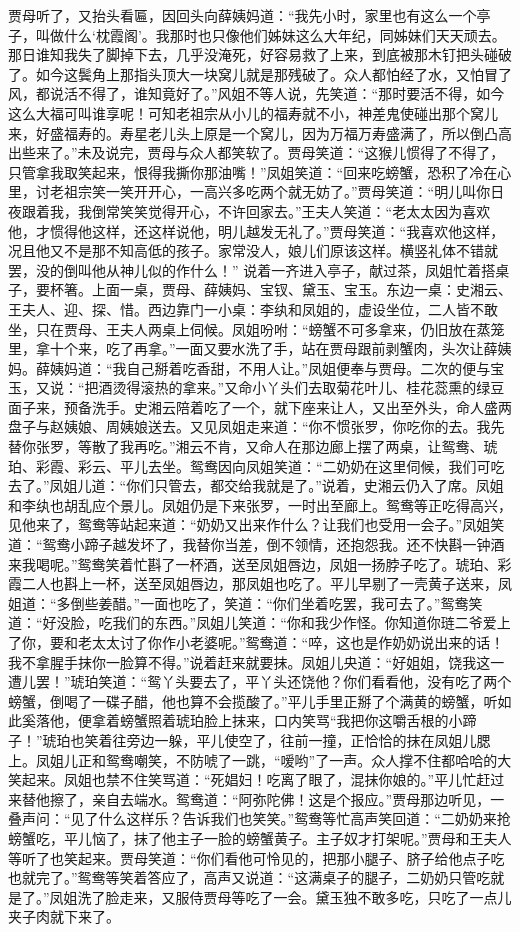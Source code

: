 \documentclass[12pt,oneside]{book}
\begin{document}
贾母听了，又抬头看匾，因回头向薛姨妈道：“我先小时，家里也有这么一个亭子，叫做什么‘枕霞阁’。我那时也只像他们姊妹这么大年纪，同姊妹们天天顽去。那日谁知我失了脚掉下去，几乎没淹死，好容易救了上来，到底被那木钉把头碰破了。如今这鬓角上那指头顶大一块窝儿就是那残破了。众人都怕经了水，又怕冒了风，都说活不得了，谁知竟好了。”风姐不等人说，先笑道：“那时要活不得，如今这么大福可叫谁享呢！可知老祖宗从小儿的福寿就不小，神差鬼使碰出那个窝儿来，好盛福寿的。寿星老儿头上原是一个窝儿，因为万福万寿盛满了，所以倒凸高出些来了。”未及说完，贾母与众人都笑软了。贾母笑道：“这猴儿惯得了不得了，只管拿我取笑起来，恨得我撕你那油嘴！”凤姐笑道：“回来吃螃蟹，恐积了冷在心里，讨老祖宗笑一笑开开心，一高兴多吃两个就无妨了。”贾母笑道：“明儿叫你日夜跟着我，我倒常笑笑觉得开心，不许回家去。”王夫人笑道：“老太太因为喜欢他，才惯得他这样，还这样说他，明儿越发无礼了。”贾母笑道：“我喜欢他这样，况且他又不是那不知高低的孩子。家常没人，娘儿们原该这样。横竖礼体不错就罢，没的倒叫他从神儿似的作什么！”
说着一齐进入亭子，献过茶，凤姐忙着搭桌子，要杯箸。上面一桌，贾母、薛姨妈、宝钗、黛玉、宝玉。东边一桌：史湘云、王夫人、迎、探、惜。西边靠门一小桌：李纨和凤姐的，虚设坐位，二人皆不敢坐，只在贾母、王夫人两桌上伺候。凤姐吩咐：“螃蟹不可多拿来，仍旧放在蒸笼里，拿十个来，吃了再拿。”一面又要水洗了手，站在贾母跟前剥蟹肉，头次让薛姨妈。薛姨妈道：“我自己掰着吃香甜，不用人让。”凤姐便奉与贾母。二次的便与宝玉，又说：“把酒烫得滚热的拿来。”又命小丫头们去取菊花叶儿、桂花蕊熏的绿豆面子来，预备洗手。史湘云陪着吃了一个，就下座来让人，又出至外头，命人盛两盘子与赵姨娘、周姨娘送去。又见凤姐走来道：“你不惯张罗，你吃你的去。我先替你张罗，等散了我再吃。”湘云不肯，又命人在那边廊上摆了两桌，让鸳鸯、琥珀、彩霞、彩云、平儿去坐。鸳鸯因向凤姐笑道：“二奶奶在这里伺候，我们可吃去了。”凤姐儿道：“你们只管去，都交给我就是了。”说着，史湘云仍入了席。凤姐和李纨也胡乱应个景儿。凤姐仍是下来张罗，一时出至廊上。鸳鸯等正吃得高兴，见他来了，鸳鸯等站起来道：“奶奶又出来作什么？让我们也受用一会子。”凤姐笑道：“鸳鸯小蹄子越发坏了，我替你当差，倒不领情，还抱怨我。还不快斟一钟酒来我喝呢。”鸳鸯笑着忙斟了一杯酒，送至凤姐唇边，凤姐一扬脖子吃了。琥珀、彩霞二人也斟上一杯，送至凤姐唇边，那凤姐也吃了。平儿早剔了一壳黄子送来，凤姐道：“多倒些姜醋。”一面也吃了，笑道：“你们坐着吃罢，我可去了。”鸳鸯笑道：“好没脸，吃我们的东西。”凤姐儿笑道：“你和我少作怪。你知道你琏二爷爱上了你，要和老太太讨了你作小老婆呢。”鸳鸯道：“啐，这也是作奶奶说出来的话！我不拿腥手抹你一脸算不得。”说着赶来就要抹。凤姐儿央道：“好姐姐，饶我这一遭儿罢！”琥珀笑道：“鸳丫头要去了，平丫头还饶他？你们看看他，没有吃了两个螃蟹，倒喝了一碟子醋，他也算不会揽酸了。”平儿手里正掰了个满黄的螃蟹，听如此奚落他，便拿着螃蟹照着琥珀脸上抹来，口内笑骂“我把你这嚼舌根的小蹄子！”琥珀也笑着往旁边一躲，平儿使空了，往前一撞，正恰恰的抹在凤姐儿腮上。凤姐儿正和鸳鸯嘲笑，不防唬了一跳，“嗳哟”了一声。众人撑不住都哈哈的大笑起来。凤姐也禁不住笑骂道：“死娼妇！吃离了眼了，混抹你娘的。”平儿忙赶过来替他擦了，亲自去端水。鸳鸯道：“阿弥陀佛！这是个报应。”贾母那边听见，一叠声问：“见了什么这样乐？告诉我们也笑笑。”鸳鸯等忙高声笑回道：“二奶奶来抢螃蟹吃，平儿恼了，抹了他主子一脸的螃蟹黄子。主子奴才打架呢。”贾母和王夫人等听了也笑起来。贾母笑道：“你们看他可怜见的，把那小腿子、脐子给他点子吃也就完了。”鸳鸯等笑着答应了，高声又说道：“这满桌子的腿子，二奶奶只管吃就是了。”凤姐洗了脸走来，又服侍贾母等吃了一会。黛玉独不敢多吃，只吃了一点儿夹子肉就下来了。
\end{document}
